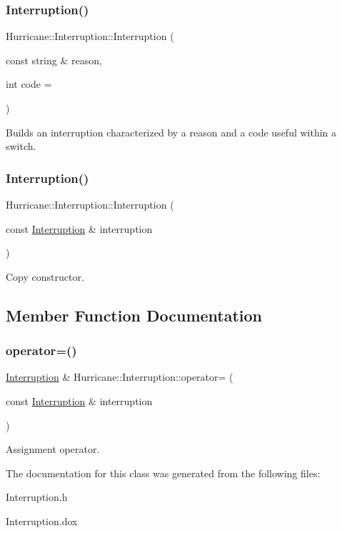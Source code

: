 \subsubsection{\texorpdfstring{Interruption()}{Interruption()}\hspace{0.1cm}{\footnotesize\ttfamily [1/2]}}
{\footnotesize\ttfamily Hurricane\+::\+Interruption\+::\+Interruption (\begin{DoxyParamCaption}\item[{const string \&}]{reason,  }\item[{int}]{code = {} }\end{DoxyParamCaption})}

Builds an interruption characterized by a reason and a code useful within a switch. \mbox{\label{classHurricane_1_1Interruption_ad84fb4212bce9f3a85b90b4a969226a6}} 
\subsubsection{\texorpdfstring{Interruption()}{Interruption()}\hspace{0.1cm}{\footnotesize\ttfamily [2/2]}}
{\footnotesize\ttfamily Hurricane\+::\+Interruption\+::\+Interruption (\begin{DoxyParamCaption}\item[{const \mbox{\hyperlink{classHurricane_1_1Interruption}{Interruption}} \&}]{interruption }\end{DoxyParamCaption})}

Copy constructor. 

\subsection{Member Function Documentation}
\mbox{\label{classHurricane_1_1Interruption_a3c528402a234e354e508b5b7512475bc}} 
\subsubsection{\texorpdfstring{operator=()}{operator=()}}
{\footnotesize\ttfamily \mbox{\hyperlink{classHurricane_1_1Interruption}{Interruption}} \& Hurricane\+::\+Interruption\+::operator= (\begin{DoxyParamCaption}\item[{const \mbox{\hyperlink{classHurricane_1_1Interruption}{Interruption}} \&}]{interruption }\end{DoxyParamCaption})}

Assignment operator. 

The documentation for this class was generated from the following files\+:\begin{DoxyCompactItemize}
\item 
Interruption.\+h\item 
Interruption.\+dox\end{DoxyCompactItemize}
